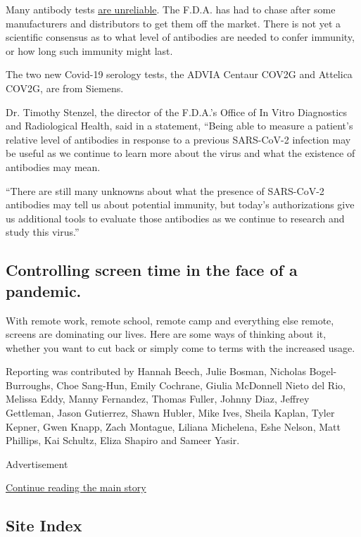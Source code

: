 Many antibody tests
\href{https://www.nytimes3xbfgragh.onion/2020/05/04/health/fda-antibody-tests-coronavirus.html}{are
unreliable}. The F.D.A. has had to chase after some manufacturers and
distributors to get them off the market. There is not yet a scientific
consensus as to what level of antibodies are needed to confer immunity,
or how long such immunity might last.

The two new Covid-19 serology tests, the ADVIA Centaur COV2G and
Attelica COV2G, are from Siemens.

Dr. Timothy Stenzel, the director of the F.D.A.'s Office of In Vitro
Diagnostics and Radiological Health, said in a statement, ``Being able
to measure a patient's relative level of antibodies in response to a
previous SARS-CoV-2 infection may be useful as we continue to learn more
about the virus and what the existence of antibodies may mean.

``There are still many unknowns about what the presence of SARS-CoV-2
antibodies may tell us about potential immunity, but today's
authorizations give us additional tools to evaluate those antibodies as
we continue to research and study this virus.''

\hypertarget{controlling-screen-time-in-the-face-of-a-pandemic}{%
\subsection{Controlling screen time in the face of a
pandemic.}\label{controlling-screen-time-in-the-face-of-a-pandemic}}

With remote work, remote school, remote camp and everything else remote,
screens are dominating our lives. Here are some ways of thinking about
it, whether you want to cut back or simply come to terms with the
increased usage.

Reporting was contributed by Hannah Beech, Julie Bosman, Nicholas
Bogel-Burroughs, Choe Sang-Hun, Emily Cochrane, Giulia McDonnell Nieto
del Rio, Melissa Eddy, Manny Fernandez, Thomas Fuller, Johnny Diaz,
Jeffrey Gettleman, Jason Gutierrez, Shawn Hubler, Mike Ives, Sheila
Kaplan, Tyler Kepner, Gwen Knapp, Zach Montague, Liliana Michelena, Eshe
Nelson, Matt Phillips, Kai Schultz, Eliza Shapiro and Sameer Yasir.

Advertisement

\protect\hyperlink{after-bottom}{Continue reading the main story}

\hypertarget{site-index}{%
\subsection{Site Index}\label{site-index}}


